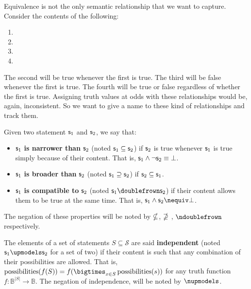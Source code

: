 \documentclass[11pt,letterpaper,fleqn]{memoir} %
\begin{document}
Equivalence is not the only semantic relationship that we want to capture. Consider the contents of the following:
\begin{enumerate}
	\item {}
	\item {}
	\item {}
	\item {}
\end{enumerate}
The second will be true whenever the first is true. The third will be false whenever the first is true. The fourth will be true or false regardless of whether the first is true. Assigning truth values at odds with these relationships would be, again, inconsistent. So we want to give a name to these kind of relationships and track them.

\begin{mathSection}

\begin{defn}
	Given two statement $\mathsf{s}_1$ and $\mathsf{s}_2$, we say that:
	\begin{itemize}
		\item $\mathsf{s}_1$ \textbf{is narrower than} $\mathsf{s}_2$ (noted $\mathsf{s}_1 \subseteq \mathsf{s}_2$) if $\mathsf{s}_2$ is true whenever $\mathsf{s}_1$ is true simply because of their content. That is, $\mathsf{s}_1 \wedge \neg \mathsf{s}_2 \equiv \bot$.
		\item $\mathsf{s}_1$ \textbf{is broader than} $\mathsf{s}_2$ (noted $\mathsf{s}_1 \supseteq \mathsf{s}_2$) if $\mathsf{s}_2 \subseteq \mathsf{s}_1$.
		\item $\mathsf{s}_1$ \textbf{is compatible to} $\mathsf{s}_2$ (noted $\stmt{s}_1 \comp \stmt{s}_2$) if their content allows them to be true at the same time. That is, $\stmt{s}_1 \AND \stmt{s}_2 \nequiv \contradiction$.

	\end{itemize}
	The negation of these properties will be noted by $\nsubseteq$, $\nsupseteq$ , $\ncomp$ respectively.
\end{defn}
\begin{defn}
	The elements of a set of statements $S \subseteq \mathcal{S}$ are said \textbf{independent} (noted $\stmt{s}_1 \indep \stmt{s}_2$ for a set of two) if their content is such that any combination of their possibilities are allowed. That is, $\poss(f(S)) = f(\bigtimes_{x \in S} \poss(s))$ for any truth function $f : \mathbb{B}^{|S|} \to \mathbb{B}$. The negation of independence, will be noted by $\nindep$.
\end{defn}

\end{mathSection}
\end{document}
